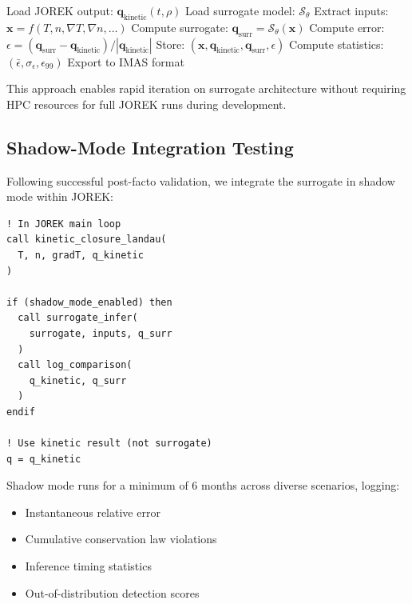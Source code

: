 \documentclass[12pt]{article}
\begin{document}
\begin{algorithm}[h]
\caption{Post-Facto Validation}
\begin{algorithmic}[1]
\State Load JOREK output: $\mathbf{q}_{\text{kinetic}}(t, \rho)$
\State Load surrogate model: $\mathcal{S}_\theta$
        \State Extract inputs: $\mathbf{x} = f(T, n, \nabla T, \nabla n, \ldots)$
        \State Compute surrogate: $\mathbf{q}_{\text{surr}} = \mathcal{S}_\theta(\mathbf{x})$
        \State Compute error: $\epsilon = (\mathbf{q}_{\text{surr}} - \mathbf{q}_{\text{kinetic}})/|\mathbf{q}_{\text{kinetic}}|$
        \State Store: $(\mathbf{x}, \mathbf{q}_{\text{kinetic}}, \mathbf{q}_{\text{surr}}, \epsilon)$
    \EndFor
\EndFor
\State Compute statistics: $(\bar{\epsilon}, \sigma_\epsilon, \epsilon_{99})$
\State Export to IMAS format
\end{algorithmic}
\end{algorithm}

This approach enables rapid iteration on surrogate architecture without requiring HPC resources for full JOREK runs during development.

\subsection{Shadow-Mode Integration Testing}

Following successful post-facto validation, we integrate the surrogate in shadow mode within JOREK:

\begin{verbatim}
! In JOREK main loop
call kinetic_closure_landau(
  T, n, gradT, q_kinetic
)

if (shadow_mode_enabled) then
  call surrogate_infer(
    surrogate, inputs, q_surr
  )
  call log_comparison(
    q_kinetic, q_surr
  )
endif

! Use kinetic result (not surrogate)
q = q_kinetic
\end{verbatim}

Shadow mode runs for a minimum of 6 months across diverse scenarios, logging:
\begin{itemize}
\item Instantaneous relative error
\item Cumulative conservation law violations
\item Inference timing statistics
\item Out-of-distribution detection scores
\end{itemize}
\end{document}

